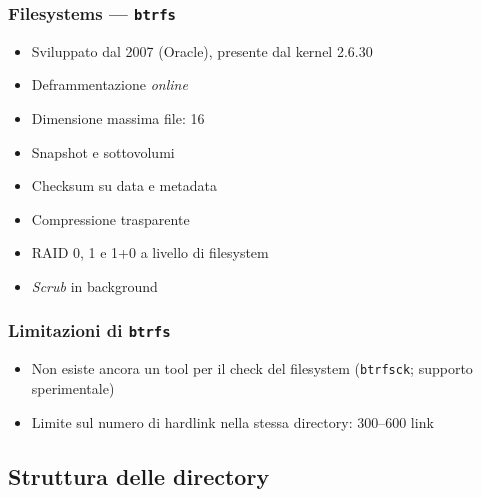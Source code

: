 \documentclass{beamer}
\begin{document}
\begin{frame}
  \frametitle{Filesystems --- \texttt{btrfs}}

  \begin{itemize}[<+->]
    \item Sviluppato dal 2007 (Oracle), presente dal kernel 2.6.30
    \item Deframmentazione \textit{online}
    \item Dimensione massima file: \SI{16}{\exbi\byte}
    \item Snapshot e sottovolumi
    \item Checksum su data e metadata
    \item Compressione trasparente
    \item RAID 0, 1 e 1+0 a livello di filesystem
    \item \textit{Scrub} in background
  \end{itemize}

\end{frame}

\begin{frame}
  \frametitle{Limitazioni di \texttt{btrfs}}
  
  \begin{itemize}[<+->]
    \item Non esiste ancora un tool per il check del filesystem
      (\texttt{btrfsck}; supporto sperimentale)
    \item Limite sul numero di hardlink nella stessa directory:
      \numrange{300}{600} link
  \end{itemize}

\end{frame}

\subsection{Struttura delle directory}
\end{document}
